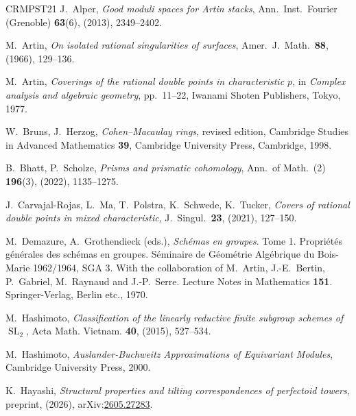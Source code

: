 \documentclass[uplatex,11pt,a4paper]{amsart} %
\numberwithin{equation}{section}
\numberwithin{figure}{section}
\numberwithin{table}{section}
\theoremstyle{plain}
\theoremstyle{definition}
\DeclareMathOperator{\SL}{SL}
\begin{document}
\begin{thebibliography}{CRMPST21}
J.~Alper,
\emph{Good moduli spaces for Artin stacks},
Ann.\ Inst.\ Fourier (Grenoble) \textbf{63}(6), (2013), 2349--2402.

M.~Artin,
\emph{On isolated rational singularities of surfaces},
Amer.\ J.\ Math.\  \textbf{88}, (1966), 129--136.

M.~Artin,
\emph{Coverings of the rational double points in characteristic $p$},
in \textit{Complex analysis and algebraic geometry}, pp.\ 11--22, Iwanami Shoten Publishers, Tokyo, 1977.

W.~Bruns, J.~Herzog,
\emph{Cohen--Macaulay rings},
revised edition,
Cambridge Studies in Advanced Mathematics \textbf{39}, Cambridge University Press, Cambridge, 1998.

B.~Bhatt, P.~Scholze,
\emph{Prisms and prismatic cohomology},
Ann.\ of Math.\ (2) \textbf{196}(3), (2022), 1135--1275.

J.~Carvajal-Rojas, L.~Ma, T.~Polstra, K.~Schwede, K.~Tucker,
\emph{Covers of rational double points in mixed characteristic},
J.\ Singul.\ \textbf{23}, (2021), 127--150.

M.~Demazure, A.~Grothendieck (eds.),
\emph{Sch\'emas en groupes}.
Tome 1. Propri\'et\'es g\'en\'erales des sch\'emas en groupes. S\'eminaire de G\'eom\'etrie Alg\'ebrique du Bois-Marie 1962/1964, SGA 3.
With the collaboration of M.~Artin, J.-E.~Bertin, P.~Gabriel, M.~Raynaud and J.-P.~Serre.
Lecture Notes in Mathematics \textbf{151}. Springer-Verlag, Berlin etc., 1970.

M.~Hashimoto,
\emph{Classification of the linearly reductive finite subgroup schemes of $\SL_2$},
Acta Math. Vietnam. \textbf{40}, (2015), 527--534.

M.~Hashimoto,
\emph{Auslander-Buchweitz Approximations of Equivariant Modules},
Cambridge University Press, 2000.

K.~Hayashi,
\emph{Structural properties and tilting correspondences of perfectoid towers},
preprint, (2026),
arXiv:\href{https://arxiv.org/abs/2605.27283}{2605.27283}.


\end{thebibliography}
\end{document}
